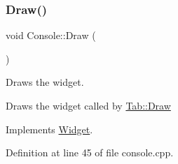 \subsubsection{\texorpdfstring{Draw()}{Draw()}}
{\footnotesize\ttfamily void Console\+::\+Draw (\begin{DoxyParamCaption}{ }\end{DoxyParamCaption})\hspace{0.3cm}{\ttfamily [virtual]}}



Draws the widget. 

Draws the widget called by \hyperlink{class_tab_ae9db0c3ae8b0b75f7c5b3493b0267482}{Tab\+::\+Draw} 

Implements \hyperlink{class_widget_ac4c2063cd671468ad05d84cfe963c032}{Widget}.



Definition at line 45 of file console.\+cpp.


